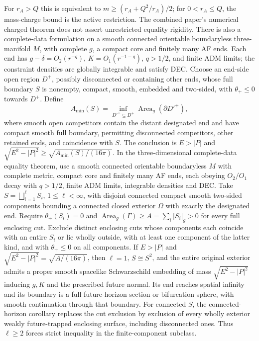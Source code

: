 \documentclass[11pt]{article}
\begin{document}
For $r_A>Q$ this is equivalent to $m\ge(r_A+Q^2/r_A)/2$; for $0<r_A\le Q$, the mass-charge bound is the active restriction. The combined paper's numerical charged theorem does not assert unrestricted equality rigidity. There is also a complete-data formulation on a smooth connected orientable boundaryless three-manifold $M$, with complete $g$, a compact core and finitely many AF ends. Each end has $g-\delta=O_2(r^{-q})$, $K=O_1(r^{-1-q})$, $q>1/2$, and finite ADM limits; the constraint densities are globally integrable and satisfy DEC. Choose an end-side open region $D^+$, possibly disconnected or containing other ends, whose full boundary $S$ is nonempty, compact, smooth, embedded and two-sided, with $\theta_+\le0$ towards $D^+$. Define
\[
 A_{\min}(S)=\inf_{D'^+\subseteq D^+}\operatorname{Area}_g(\partial D'^+),
\]
where smooth open competitors contain the distant designated end and have compact smooth full boundary, permitting disconnected competitors, other retained ends, and coincidence with $S$. The conclusion is $E>|P|$ and $\sqrt{E^2-|P|^2}\ge\sqrt{A_{\min}(S)/(16\pi)}$. In the three-dimensional complete-data equality theorem, use a smooth connected orientable boundaryless $M$ with complete metric, compact core and finitely many AF ends, each obeying $O_2/O_1$ decay with $q>1/2$, finite ADM limits, integrable densities and DEC. Take $S=\bigsqcup_{i=1}^{\ell}S_i$, $1\le\ell<\infty$, with disjoint connected compact smooth two-sided components bounding a connected closed exterior $\Omega$ with exactly the designated end. Require $\theta_+(S_i)=0$ and $\operatorname{Area}_g(\Gamma)\ge A=\sum_i|S_i|_g>0$ for every full enclosing cut. Exclude distinct enclosing cuts whose components each coincide with an entire $S_i$ or lie wholly outside, with at least one component of the latter kind, and with $\theta_+\le0$ on all components. If $E>|P|$ and $\sqrt{E^2-|P|^2}=\sqrt{A/(16\pi)}$, then $\ell=1$, $S\cong S^2$, and the entire original exterior admits a proper smooth spacelike Schwarzschild embedding of mass $\sqrt{E^2-|P|^2}$ inducing $g,K$ and the prescribed future normal. Its end reaches spatial infinity and its boundary is a full future-horizon section or bifurcation sphere, with smooth continuation through that boundary. For connected $S$, the connected-horizon corollary replaces the cut exclusion by exclusion of every wholly exterior weakly future-trapped enclosing surface, including disconnected ones. Thus $\ell\ge2$ forces strict inequality in the finite-component subclass.
\end{document}
